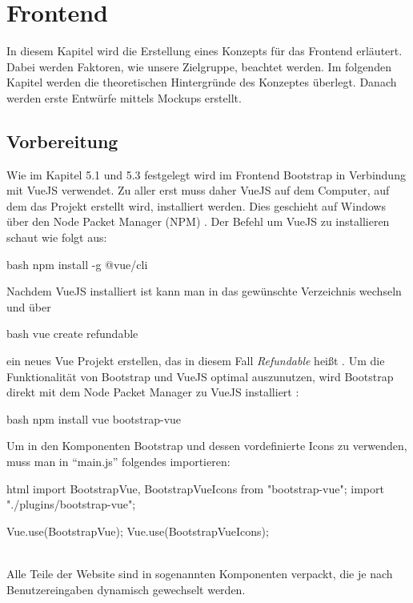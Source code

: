 \section{Frontend}
\label{chapter:implementierung-frontend}
In diesem Kapitel wird die Erstellung eines Konzepts für das Frontend erläutert. Dabei werden Faktoren, wie unsere Zielgruppe,  beachtet werden. Im folgenden Kapitel werden die theoretischen Hintergründe des Konzeptes überlegt. Danach werden erste Entwürfe mittels Mockups erstellt. 
\subsection{Vorbereitung}
\label{chapter:implementierung-frontend-vorbereitung}
Wie im Kapitel 5.1 und 5.3 festgelegt wird im Frontend Bootstrap in Verbindung mit VueJS verwendet. Zu aller erst muss daher VueJS auf dem Computer, auf dem das Projekt erstellt wird, installiert werden. Dies geschieht auf Windows über den Node Packet Manager (NPM) \cite{vue-install}. Der Befehl um VueJS zu installieren schaut wie folgt aus:
\begin{code}{bash}
	npm install -g @vue/cli
\end{code}
Nachdem VueJS installiert ist kann man in das gewünschte Verzeichnis wechseln und über
\begin{code}{bash}
	vue create refundable
\end{code}
ein neues Vue Projekt erstellen, das in diesem Fall \textit{Refundable} heißt \cite{vue-create-project}. Um die Funktionalität von Bootstrap und VueJS optimal auszunutzen, wird Bootstrap direkt mit dem Node Packet Manager zu VueJS installiert \cite{bootstrap-vue-getting-started}:
\begin{code}{bash}
	npm install vue bootstrap-vue
\end{code}
Um in den Komponenten Bootstrap und dessen vordefinierte Icons zu verwenden, muss man in \enquote{main.js} folgendes importieren:
\begin{code}{html}
	import { BootstrapVue, BootstrapVueIcons } from "bootstrap-vue";
	import "./plugins/bootstrap-vue";
	
	Vue.use(BootstrapVue);
	Vue.use(BootstrapVueIcons);
\end{code}
	\label{list:requcommands} ~\\
Alle Teile der Website sind in sogenannten Komponenten verpackt, die je nach Benutzereingaben dynamisch gewechselt werden. 

